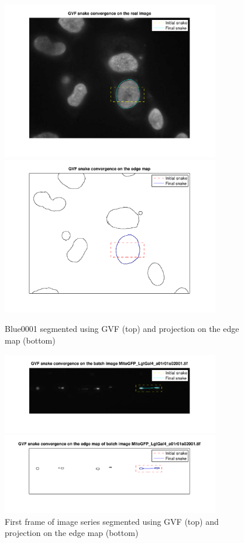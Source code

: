 \documentclass{article}
\begin{document}
\begin{figure}
\centering
\includegraphics[width=0.85\textwidth]{figures/gvf2.pdf}
\includegraphics[width=0.85\textwidth]{figures/gvf2_edge.pdf}
\caption{Blue0001 segmented using GVF (top) and projection on the edge map (bottom)}
\label{fig:gvf2}
\end{figure}


\begin{figure}
\centering
\includegraphics[width=0.85\textwidth]{figures/gvf3.pdf}

\includegraphics[width=0.85\textwidth]{figures/gvf3_edge.pdf}
\caption{First frame of image series segmented using GVF (top) and projection on the edge map (bottom)}
\label{fig:gvf3}
\end{figure}
\end{document}
